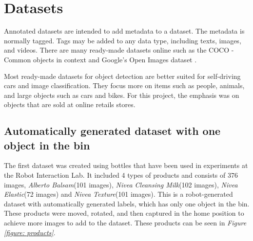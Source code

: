 \clearpage
\section{Datasets}
Annotated datasets are intended to add metadata to a dataset. The metadata is normally tagged. Tags may be added to any data type, including texts, images, and videos. There are many ready-made datasets online such as the COCO - Common objects in context \cite{noauthor_what_nodate} and Google’s Open Images dataset \cite{noauthor_open_nodate}.

Most ready-made datasets for object detection are better suited for self-driving cars and image classification. They focus more on items such as people, animals, and large objects such as cars and bikes. For this project, the emphasis was on objects that are sold at online retails stores.

\subsection{Automatically generated dataset with one object in the bin} \label{sec:firstdataset}
The first dataset was created using bottles that have been used in experiments at the Robot Interaction Lab. It included 4 types of products and consists of 376 images, \textit{Alberto Balsam}(101 images), \textit{Nivea Cleansing Milk}(102 images), \textit{Nivea Elastic}(72 images) and \textit{Nivea Texture}(101 images). 
This is a robot-generated dataset with automatically generated labels, which has only one object in the bin. 
These products were moved, rotated, and then captured in the home position to achieve more images to add to the dataset. 
These products can be seen in \textit{Figure \ref{figure: products}}.

